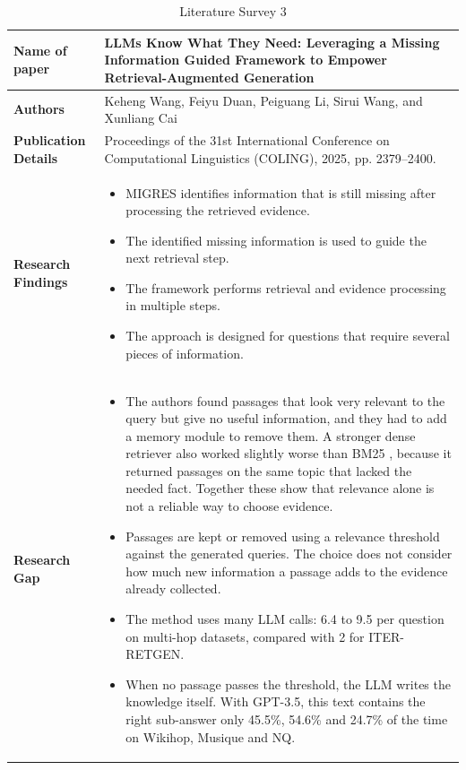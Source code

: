 \documentclass[12pt,a4paper]{report}
\begin{document}
\begin{longtable}{|p{1.25in}|p{5.15in}|}
\caption{Literature Survey 3}\label{tab:lit3}\\
\hline
\hline

\textbf{Name of paper} & LLMs Know What They Need: Leveraging a Missing Information Guided Framework to Empower Retrieval-Augmented Generation \cite{wang2025migres} \\ \hline

\textbf{Authors} & Keheng Wang, Feiyu Duan, Peiguang Li, Sirui Wang, and Xunliang Cai \\ \hline

\textbf{Publication Details} & Proceedings of the 31st International Conference on Computational Linguistics (COLING), 2025, pp. 2379--2400. \\ \hline

\textbf{Research Findings} &
\begin{itemize}[leftmargin=0.18in,itemsep=0.05in,topsep=0pt,parsep=0pt]
\item MIGRES identifies information that is still missing after processing the retrieved evidence.
\item The identified missing information is used to guide the next retrieval step.
\item The framework performs retrieval and evidence processing in multiple steps.
\item The approach is designed for questions that require several pieces of information.
\end{itemize} \\ \hline

\textbf{Research Gap} &
\begin{itemize}[leftmargin=0.18in,itemsep=0.05in,topsep=0pt,parsep=0pt]
\item The authors found passages that look very relevant to the query but give no useful information, and they had to add a memory module to remove them. A stronger dense retriever also worked slightly worse than BM25 \cite{robertson2009bm25}, because it returned passages on the same topic that lacked the needed fact. Together these show that relevance alone is not a reliable way to choose evidence. %
\item Passages are kept or removed using a relevance threshold against the generated queries. The choice does not consider how much new information a passage adds to the evidence already collected. %
\item The method uses many LLM calls: 6.4 to 9.5 per question on multi-hop datasets, compared with 2 for ITER-RETGEN. %
\item When no passage passes the threshold, the LLM writes the knowledge itself. With GPT-3.5, this text contains the right sub-answer only 45.5\%, 54.6\% and 24.7\% of the time on Wikihop, Musique and NQ. %
\end{itemize} \\ \hline


\end{longtable}
\end{document}
